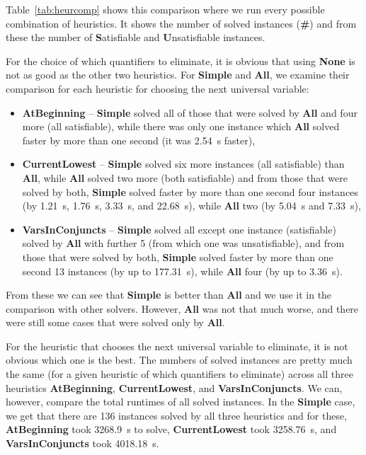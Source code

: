 \documentclass[
  digital, %
  color,
  twoside, %
  table,   %
  nolof,     %
  nolot,     %
]{fithesis3}
\theoremstyle{definition}
\theoremstyle{remark}
\newcommand{\QEnone}{\textbf{None}}
\newcommand{\QEsimple}{\textbf{Simple}}
\newcommand{\QEall}{\textbf{All}}
\newcommand{\QUatbeginning}{\textbf{At\-Be\-gin\-ning}}
\newcommand{\QUcurrentlowest}{\textbf{CurrentLowest}}
\newcommand{\QUvarsinconjuncts}{\textbf{VarsInConjuncts}}
\begin{document}
Table~\ref{tab:heurcomp} shows this comparison where we run every possible combination of heuristics. It shows the number of solved instances (\textbf{\#}) and from these the number of \textbf{S}atisfiable and \textbf{U}n\-sa\-ti\-sfi\-able instances. 

For the choice of which quantifiers to eliminate, it is obvious that using \QEnone{} is not as good as the other two heuristics. For \QEsimple{} and \QEall{}, we examine their comparison for each heuristic for choosing the next universal variable:
\begin{itemize}
    \item \QUatbeginning{} -- \QEsimple{} solved all of those that were solved by \QEall{} and four more (all satisfiable), while there was only one instance which \QEall{} solved faster by more than one second (it was \SI{2.54}{s} faster),
    \item \QUcurrentlowest{} -- \QEsimple{} solved six more instances (all satisfiable) than \QEall{}, while \QEall{} solved two more (both satisfiable) and from those that were solved by both, \QEsimple{} solved faster by more than one second four instances (by \SI{1.21}{s}, \SI{1.76}{s}, \SI{3.33}{s}, and \SI{22.68}{s}), while \QEall{} two (by \SI{5.04}{s} and \SI{7.33}{s}),
    \item \QUvarsinconjuncts{} -- \QEsimple{} solved all except one instance (satisfiable) solved by \QEall{} with further 5 (from which one was unsatisfiable), and from those that were solved by both, \QEsimple{} solved faster by more than one second 13 instances (by up to \SI{177.31}{s}), while \QEall{} four (by up to \SI{3.36}{s}).
\end{itemize}
From these we can see that \QEsimple{} is better than \QEall{} and we use it in the comparison with other solvers. However, \QEall{} was not that much worse, and there were still some cases that were solved only by \QEall{}.

For the heuristic that chooses the next universal variable to eliminate, it is not obvious which one is the best. The numbers of solved instances are pretty much the same (for a given heuristic of which quantifiers to eliminate) across all three heuristics \QUatbeginning{}, \QUcurrentlowest{}, and \QUvarsinconjuncts{}. We can, however, compare the total runtimes of all solved instances. In the \QEsimple{} case, we get that there are 136 instances solved by all three heuristics and for these, \QUatbeginning{} took \SI{3268.9}{s} to solve, \QUcurrentlowest{} took \SI{3258.76}{s}, and \QUvarsinconjuncts{} took \SI{4018.18}{s}.
\end{document}
